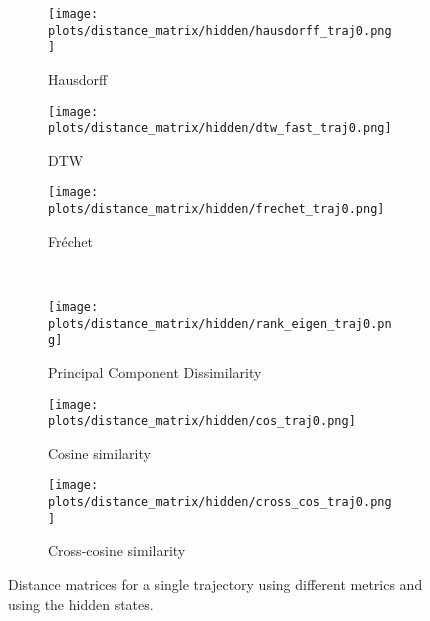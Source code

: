 \documentclass[a4paper,12pt]{article}
\begin{document}
\begin{figure}[H]
    \centering
    \begin{subfigure}[b]{0.32\textwidth}
        \centering
        \texttt{[image: plots/distance\_matrix/hidden/hausdorff\_traj0.png]}
        \caption{Hausdorff}
    \end{subfigure}
    \begin{subfigure}[b]{0.32\textwidth}
        \centering
        \texttt{[image: plots/distance\_matrix/hidden/dtw\_fast\_traj0.png]}
        \caption{DTW}
    \end{subfigure}
    \begin{subfigure}[b]{0.32\textwidth}
        \centering
        \texttt{[image: plots/distance\_matrix/hidden/frechet\_traj0.png]}
        \caption{Fréchet}
    \end{subfigure}
    \\[0.5em]
    \begin{subfigure}[b]{0.32\textwidth}
        \centering
        \texttt{[image: plots/distance\_matrix/hidden/rank\_eigen\_traj0.png]}
        \caption{Principal Component Dissimilarity}
    \end{subfigure}
    \begin{subfigure}[b]{0.32\textwidth}
        \centering
        \texttt{[image: plots/distance\_matrix/hidden/cos\_traj0.png]}
        \caption{Cosine similarity}
    \end{subfigure}
    \begin{subfigure}[b]{0.32\textwidth}
        \centering
        \texttt{[image: plots/distance\_matrix/hidden/cross\_cos\_traj0.png]}
        \caption{Cross-cosine similarity}
    \end{subfigure}
    \caption{Distance matrices for a single trajectory using different metrics and using the hidden states.}
    \label{fig:distance_metrics_comparison_hidden}
\end{figure}
\end{document}
